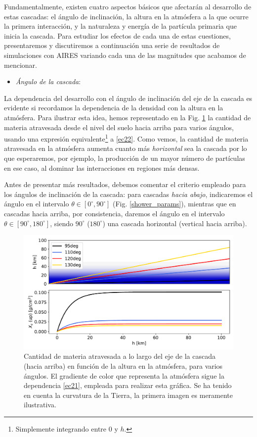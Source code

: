 \documentclass[12 pt, a4paper]{article} %
\numberwithin{equation}{section}
\numberwithin{figure}{section}
\numberwithin{table}{section}
\begin{document}
Fundamentalmente, existen cuatro aspectos básicos que afectarán al desarrollo de estas cascadas: el ángulo de inclinación, la altura en la atmósfera a la que ocurre la primera interacción, y la naturaleza y energía de la partícula primaria que inicia la cascada. Para estudiar los efectos de cada una de estas cuestiones, presentaremos y discutiremos a continuación una serie de resultados de simulaciones con AIRES variando cada una de las magnitudes que acabamos de mencionar.
\begin{itemize}
	\item \textit{Ángulo de la cascada}:
\end{itemize}
	La dependencia del desarrollo con el ángulo de inclinación del eje de la cascada es evidente si recordamos la dependencia de la densidad con la altura en la atmósfera. Para ilustrar esta idea, hemos representado en la Fig. \ref{Profatravesadavsang} la cantidad de materia atravesada desde el nivel del suelo hacia arriba para varios ángulos, usando una expresión equivalente\footnote{ Simplemente integrando entre $0$ y $h$.} a \eqref{ec22}. Como vemos, la cantidad de materia atravesada en la atmósfera aumenta cuanto más \textit{horizontal} sea la cascada por lo que esperaremos, por ejemplo, la producción de un mayor número de partículas en ese caso, al dominar las interacciones en regiones más densas.
	
	Antes de presentar más resultados, debemos comentar el criterio empleado para los ángulos de inclinación de la cascada: para cascadas \textit{hacia abajo}, indicaremos el ángulo en el intervalo $\theta\in[0^\circ, 90^\circ]$ (Fig. \ref{shower_params}), mientras que en cascadas hacia arriba, por consistencia, daremos el ángulo en el intervalo  $\theta\in[90^\circ, 180^\circ]$, siendo $
	90^\circ$ ($180^\circ$) una cascada horizontal (vertical hacia arriba).
\clearpage
	\begin{figure}[H]
		\centering
		\includegraphics[width=.8\linewidth]{figures/cascadas/Profatravesadavsang}
		\caption{Cantidad de materia atravesada a lo largo del eje de la cascada (hacia arriba) en función de la altura en la atmósfera, para varios ángulos. El gradiente de color que representa la atmósfera sigue la dependencia \eqref{ec21}, empleada para realizar esta gráfica. Se ha tenido en cuenta la curvatura de la Tierra,  la primera imagen es meramente ilustrativa.}
		\label{Profatravesadavsang}
	\end{figure}
\end{document}
